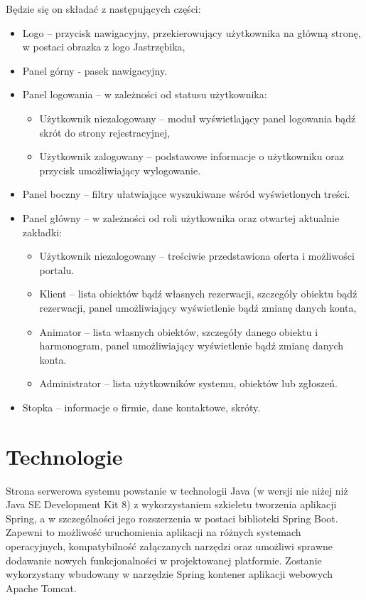 \documentclass[a4paper,11pt]{article}
\begin{document}
    Będzie się on składać z następujących części:

    \begin{itemize}
        \item Logo -- przycisk nawigacyjny, przekierowujący użytkownika na główną stronę, w postaci obrazka z logo Jastrzębika,
        \item Panel górny - pasek nawigacyjny.
        \item Panel logowania -- w zależności od statusu użytkownika:
            \begin{itemize}
                \item Użytkownik niezalogowany -- moduł wyświetlający panel logowania bądź skrót do strony rejestracyjnej,
                \item Użytkownik zalogowany -- podstawowe informacje o użytkowniku oraz przycisk umożliwiający wylogowanie.
            \end{itemize}
        \item Panel boczny -- filtry ułatwiające wyszukiwane wśród wyświetlonych treści. 
        \item Panel główny -- w zależności od roli użytkownika oraz otwartej aktualnie zakładki:
            \begin{itemize}
                \item Użytkownik niezalogowany -- treściwie przedstawiona oferta i możliwości portalu. 
                \item Klient -- lista obiektów bądź własnych rezerwacji, szczegóły obiektu bądź rezerwacji, panel umożliwiający wyświetlenie bądź zmianę danych konta,
                \item Animator -- lista własnych obiektów, szczegóły danego obiektu i harmonogram, panel umożliwiający wyświetlenie bądź zmianę danych konta.
                \item Administrator -- lista użytkowników systemu, obiektów lub zgłoszeń.
            \end{itemize}
        \item Stopka -- informacje o firmie, dane kontaktowe, skróty.
    \end{itemize}

\section{Technologie}

    Strona serwerowa systemu powstanie w technologii Java (w wersji nie niżej niż Java SE Development Kit 8) z wykorzystaniem szkieletu tworzenia aplikacji Spring, a w szczególności jego rozszerzenia w postaci biblioteki Spring Boot. Zapewni to możliwość uruchomienia aplikacji na różnych systemach operacyjnych, kompatybilność załączanych narzędzi oraz umożliwi sprawne dodawanie nowych funkcjonalności w projektowanej platformie. Zostanie wykorzystany wbudowany w narzędzie Spring kontener aplikacji webowych Apache Tomcat. 
    
\end{document}
